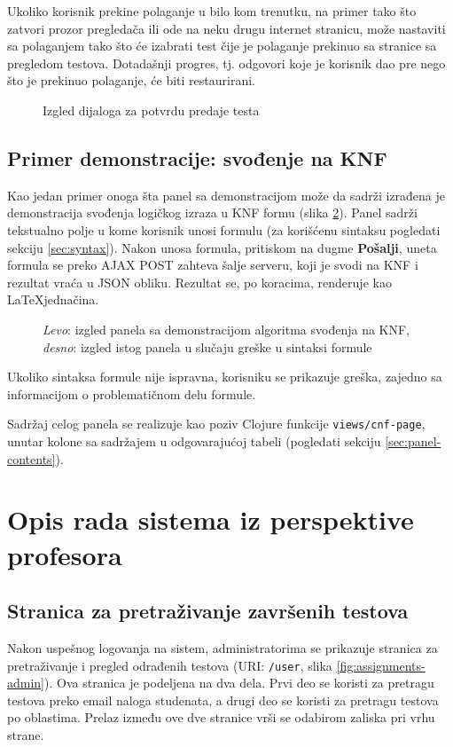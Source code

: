 Ukoliko korisnik prekine polaganje u bilo kom trenutku, na primer tako što zatvori prozor pregledača ili ode na neku drugu internet stranicu, može nastaviti sa polaganjem tako što će izabrati test čije je polaganje prekinuo sa stranice sa pregledom testova. Dotadašnji progres, tj. odgovori koje je korisnik dao pre nego što je prekinuo polaganje, će biti restaurirani.
\begin{figure}[h]
\centering
{}
\caption{Izgled dijaloga za potvrdu predaje testa}
\label{fig:task-submit}
\end{figure}

\subsection{Primer demonstracije: svođenje na KNF}
Kao jedan primer onoga šta panel sa demonstracijom može da sadrži izrađena je demonstracija svođenja logičkog izraza u KNF formu (slika \ref{fig:cnf}). Panel sadrži tekstualno polje u kome korisnik unosi formulu (za korišćenu sintaksu pogledati sekciju \ref{sec:syntax}). Nakon unosa formula, pritiskom na dugme \textbf{Pošalji}, uneta formula se preko AJAX POST zahteva šalje serveru, koji je svodi na KNF i rezultat vraća u JSON obliku. Rezultat se, po koracima, renderuje kao \LaTeX jednačina.
\begin{figure}[h]
\centering
{}
\caption{\textit{Levo}: izgled panela sa demonstracijom algoritma svođenja na KNF, \textit{desno}: izgled istog panela u slučaju greške u sintaksi formule}
\label{fig:cnf}
\end{figure}
Ukoliko sintaksa formule nije ispravna, korisniku se prikazuje greška, zajedno sa informacijom o problematičnom delu formule.

Sadržaj celog panela se realizuje kao poziv Clojure funkcije \texttt{views/cnf-page}, unutar kolone sa sadržajem u odgovarajućoj tabeli (pogledati sekciju \ref{sec:panel-contents}).

\section{Opis rada sistema iz perspektive profesora}
\subsection{Stranica za pretraživanje završenih testova}
Nakon uspešnog logovanja na sistem, administratorima se prikazuje stranica za pretraživanje i pregled odrađenih testova (URI: \texttt{/user}, slika \ref{fig:assignments-admin}). Ova stranica je podeljena na dva dela. Prvi deo se koristi za pretragu testova preko email naloga studenata, a drugi deo se koristi za pretragu testova po oblastima. Prelaz između ove dve stranice vrši se odabirom zaliska pri vrhu strane.

